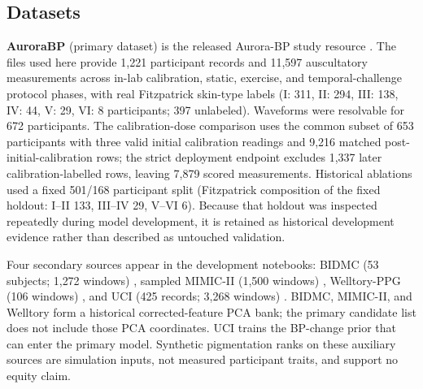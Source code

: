 \documentclass[journal]{IEEEtran}
\begin{document}
\subsection{Datasets}
\label{sec:datasets}
\textbf{AuroraBP} (primary dataset) is the released Aurora-BP study resource \cite{aurorabp2022,aurorabpDataset}. The files used here provide 1{,}221 participant records and 11{,}597 auscultatory measurements across in-lab calibration, static, exercise, and temporal-challenge protocol phases, with real Fitzpatrick skin-type labels (I: 311, II: 294, III: 138, IV: 44, V: 29, VI: 8 participants; 397 unlabeled). Waveforms were resolvable for 672 participants. The calibration-dose comparison uses the common subset of 653 participants with three valid initial calibration readings and 9{,}216 matched post-initial-calibration rows; the strict deployment endpoint excludes 1{,}337 later calibration-labelled rows, leaving 7{,}879 scored measurements. Historical ablations used a fixed 501/168 participant split (Fitzpatrick composition of the fixed holdout: I--II 133, III--IV 29, V--VI 6). Because that holdout was inspected repeatedly during model development, it is retained as historical development evidence rather than described as untouched validation.
\begin{table}[t]
\centering
\caption{AuroraBP Cohort and Strict-Endpoint Flow}
\label{tab:cohortflow}
\scriptsize
{}
\end{table}
Four secondary sources appear in the development notebooks: BIDMC (53 subjects; 1{,}272 windows) \cite{bidmcDataset,pimentel2017,physionet2000}, sampled MIMIC-II (1{,}500 windows) \cite{mimicii2011,mimiciiDataset}, Welltory-PPG (106 windows) \cite{welltory2021}, and UCI (425 records; 3{,}268 windows) \cite{uciCufflessDataset,kachuee2015}. BIDMC, MIMIC-II, and Welltory form a historical corrected-feature PCA bank; the primary candidate list does not include those PCA coordinates. UCI trains the BP-change prior that can enter the primary model. Synthetic pigmentation ranks on these auxiliary sources are simulation inputs, not measured participant traits, and support no equity claim.
\end{document}
